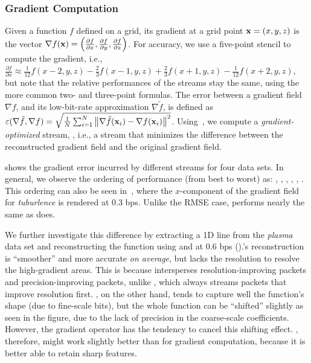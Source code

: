 \subsubsection{Gradient Computation} \label{sec:gradient}

Given a function $f$ defined on a grid, its gradient at a grid point \mbox{$\x = (x,y,z)$} is the
vector $\nabla f(\x) = \left(\frac{\partial f}{\partial x}, \frac{\partial f}{\partial y},
\frac{\partial f}{\partial z}\right)$. For accuracy, we use a five-point stencil to compute the
gradient, i.e., $\frac{\partial f}{\partial x} \approx \frac{1}{12}f(x-2,y,z) -
\frac{2}{3}f(x-1,y,z) + \frac{2}{3}f(x+1,y,z) - \frac{1}{12}f(x+2,y,z)$, but note that the relative
performances of the streams stay the same, using the more common two- and three-point formulas. The
error between a gradient field $\nabla f$, and its low-bit-rate approximation $\nabla
\tilde{f}$, is defined as $\err(\nabla \tilde{f}, \nabla f) = \sqrt{\frac{1}{N}
\sum_{i=1}^{N}{\norm{\nabla \tilde{f}(\x_i)-\nabla f(\x_i)}^2}}$. Using~, we
compute a \emph{gradient-optimized} stream, \sgop, i.e., a stream that minimizes the difference
between the reconstructed gradient field and the original gradient field.

 shows the gradient error incurred by different streams for four
data sets. In general, we observe the ordering of performance (from best to worst) as: \sgop, \sgsg,
\sbit, \swav, \smag, \slvl. This ordering can also be seen in~,
where the $x$-component of the gradient field for \emph{tuburlence} is rendered at 0.3 bps. Unlike
the RMSE case, \sbit performs nearly the same as \swav does.

We further investigate this difference by extracting a 1D line from the \emph{plasma} data set and
reconstructing the function using \sbit and \swav at 0.6 bps
().\swav's reconstruction is ``smoother'' and more
accurate \emph{on average}, but lacks the resolution to resolve the high-gradient areas. This is
because \swav intersperses resolution-improving packets and precision-improving packets, unlike
\sbit, which always streams packets that improve resolution first. \sbit, on the other hand, tends
to capture well the function's shape (due to fine-scale bits), but the whole function can be
``shifted'' slightly as seen in the figure, due to the lack of precision in the coarse-scale
coefficients. However, the gradient operator has the tendency to cancel this shifting effect. \sbit,
therefore, might work slightly better than \swav for gradient computation, because it is better able
to retain sharp features.

